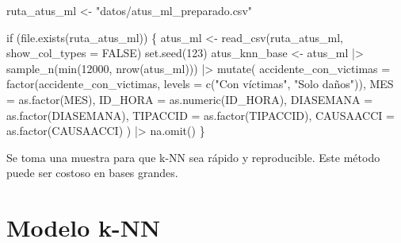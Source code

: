 \documentclass[
  spanish,
  10.5pt,
  letterpaper,
  openany,
  headings=big]{scrbook}
\newenvironment{Shaded}{}{}
\newcommand{\AttributeTok}[1]{\textcolor[rgb]{0.84,0.23,0.29}{#1}}
\newcommand{\ConstantTok}[1]{\textcolor[rgb]{0.00,0.36,0.77}{#1}}
\newcommand{\ControlFlowTok}[1]{\textcolor[rgb]{0.84,0.23,0.29}{#1}}
\newcommand{\DecValTok}[1]{\textcolor[rgb]{0.00,0.36,0.77}{#1}}
\newcommand{\FunctionTok}[1]{\textcolor[rgb]{0.44,0.26,0.76}{#1}}
\newcommand{\NormalTok}[1]{\textcolor[rgb]{0.14,0.16,0.18}{#1}}
\newcommand{\OtherTok}[1]{\textcolor[rgb]{0.44,0.26,0.76}{#1}}
\newcommand{\SpecialCharTok}[1]{\textcolor[rgb]{0.00,0.36,0.77}{#1}}
\newcommand{\StringTok}[1]{\textcolor[rgb]{0.01,0.18,0.38}{#1}}
\begin{document}
\begin{Shaded}
\begin{Highlighting}[]
\NormalTok{ruta\_atus\_ml }\OtherTok{\textless{}{-}} \StringTok{"datos/atus\_ml\_preparado.csv"}

\ControlFlowTok{if}\NormalTok{ (}\FunctionTok{file.exists}\NormalTok{(ruta\_atus\_ml)) \{}
\NormalTok{  atus\_ml }\OtherTok{\textless{}{-}} \FunctionTok{read\_csv}\NormalTok{(ruta\_atus\_ml, }\AttributeTok{show\_col\_types =} \ConstantTok{FALSE}\NormalTok{)}
  \FunctionTok{set.seed}\NormalTok{(}\DecValTok{123}\NormalTok{)}
\NormalTok{  atus\_knn\_base }\OtherTok{\textless{}{-}}\NormalTok{ atus\_ml }\SpecialCharTok{|\textgreater{}}
    \FunctionTok{sample\_n}\NormalTok{(}\FunctionTok{min}\NormalTok{(}\DecValTok{12000}\NormalTok{, }\FunctionTok{nrow}\NormalTok{(atus\_ml))) }\SpecialCharTok{|\textgreater{}}
    \FunctionTok{mutate}\NormalTok{(}
      \AttributeTok{accidente\_con\_victimas =} \FunctionTok{factor}\NormalTok{(accidente\_con\_victimas, }\AttributeTok{levels =} \FunctionTok{c}\NormalTok{(}\StringTok{"Con víctimas"}\NormalTok{, }\StringTok{"Solo daños"}\NormalTok{)),}
      \AttributeTok{MES =} \FunctionTok{as.factor}\NormalTok{(MES),}
      \AttributeTok{ID\_HORA =} \FunctionTok{as.numeric}\NormalTok{(ID\_HORA),}
      \AttributeTok{DIASEMANA =} \FunctionTok{as.factor}\NormalTok{(DIASEMANA),}
      \AttributeTok{TIPACCID =} \FunctionTok{as.factor}\NormalTok{(TIPACCID),}
      \AttributeTok{CAUSAACCI =} \FunctionTok{as.factor}\NormalTok{(CAUSAACCI)}
\NormalTok{    ) }\SpecialCharTok{|\textgreater{}}
    \FunctionTok{na.omit}\NormalTok{()}
\NormalTok{\}}
\end{Highlighting}
\end{Shaded}

\begin{tcolorbox}[enhanced jigsaw, arc=.35mm, bottomrule=.15mm, bottomtitle=1mm, breakable, colback=white, colbacktitle=quarto-callout-note-color!10!white, colframe=quarto-callout-note-color-frame, coltitle=black, left=2mm, leftrule=.75mm, opacityback=0, opacitybacktitle=0.6, rightrule=.15mm, title=\textcolor{quarto-callout-note-color}{\faInfo}\hspace{0.5em}{Explicación del código}, titlerule=0mm, toprule=.15mm, toptitle=1mm]

Se toma una muestra para que k-NN sea rápido y reproducible. Este método
puede ser costoso en bases grandes.

\end{tcolorbox}

\section{Modelo k-NN}\label{modelo-k-nn}
\end{document}

